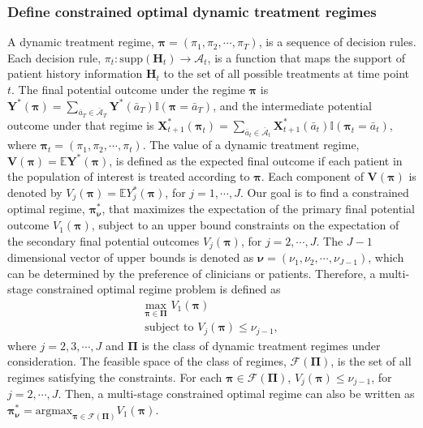 \documentclass{article}
\newcommand{\bs}{ \boldsymbol}
\newcommand{\mb}{\mathbb}
\newcommand{\ml}{\mathcal}
\newcommand{\br}{\bar}
\newcommand{\txt}{\text}
\begin{document}
\subsubsection{Define constrained optimal dynamic treatment regimes }
A dynamic treatment regime, $\bs{\pi} = (\pi_1, \pi_2, \cdots, \pi_T)$, is a sequence of decision rules. Each decision rule, $\pi_t : \text{supp}( \bs{H}_t ) \to \ml{A}_t$, is a function that maps the support of patient history information $\bs{H}_t$ to the set of all possible treatments at time point $t$. The final potential outcome under the regime $\bs{\pi}$ is $\bs{Y}^*(\bs{\pi}) = \sum_{\br{a}_T \in \br{\ml{A}}_T}\bs{Y}^*(\br{a}_T)\mb{I}(\bs{\pi} = \br{a}_T)$, and the intermediate potential outcome under that regime is $\bs{X}_{t+1}^*(\bs{\pi}_{t}) = \sum_{\br{a}_t \in \br{\ml{A}}_t}\bs{X}_{t+1}^*(\br{a}_{t})\mb{I}(\bs{\pi}_t = \br{a}_t)$, where $\bs{\pi}_t = (\pi_1, \pi_2, \cdots, \pi_t)$. The value of a dynamic treatment regime, $\bs{V}(\bs{\pi}) = \mb{E}\bs{Y}^*(\bs{\pi})$, is defined as the expected final outcome if each patient in the population of interest is treated according to $\bs{\pi}$. Each component of $\bs{V}(\bs{\pi})$ is denoted by $V_j(\bs{\pi}) = \mb{E}Y_j^*(\bs{\pi})$, for $j = 1, \cdots, J$. Our goal is to find a constrained optimal regime, $\bs{\pi}_{\bs{\nu}}^{*}$, that maximizes the expectation of the primary final potential outcome $V_1\left( \bs{\pi}\right) $, subject to an upper bound constraints on the expectation of the secondary final potential outcomes $V_j\left( \bs{\pi}\right)$, for $j=2 ,\cdots, J$.  The $J-1$ dimensional vector of upper bounds is denoted as $\bs{\nu} = (\nu_1, \nu_2, \cdots, \nu_{J-1})$, which can be determined by the preference of clinicians or patients.  Therefore, a multi-stage constrained optimal regime problem is defined as
\begin{equation}
\begin{gathered}
 \underset{\bs{\pi} \in \bs{\Pi}}{\txt{max}} \,\,
 V_1( \bs{\pi} )  \\
  \txt{subject to}  \,\, V_j( \bs{\pi} ) \le \nu_{j-1},
\end{gathered}
\end{equation}
where $j = 2, 3, \cdots, J$  and $\bs{\Pi}$ is the class of dynamic treatment regimes under consideration. The feasible space of the class of regimes, $\ml{F}(\bs{\Pi})$, is the set of all regimes satisfying the constraints. For each $\bs{\pi} \in \ml{F}(\bs{\Pi})$, $V_j(\bs{\pi}) \le \nu_{j-1}$, for $j = 2, \cdots, J$. Then, a multi-stage constrained optimal regime can also be written as $\bs{\pi}_{\bs{\nu}}^*= \text{argmax}_{{\bs{\pi} \in \ml{F}(\bs{\Pi})}}V_1 (\bs{\pi})$.\\
\end{document}
